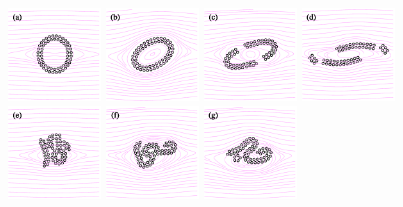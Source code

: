 \documentclass[aps,prl,preprint,groupedaddress]{revtex4-2}
\begin{document}
\begin{figure}
  \begin{center}
      \includegraphics[width=0.22\textwidth]{VS_0.pdf}
      \includegraphics[width=0.22\textwidth]{VS_1.pdf}
   \includegraphics[width=0.22\textwidth]{VS_2.pdf}
   \includegraphics[width=0.22\textwidth]{VS_3.pdf}\\
         \includegraphics[width=0.22\textwidth]{BS_0.pdf}
      \includegraphics[width=0.22\textwidth]{BS_1.pdf}
   \includegraphics[width=0.22\textwidth]{BS_2.pdf}

\end{center}
\end{figure}
\end{document}
